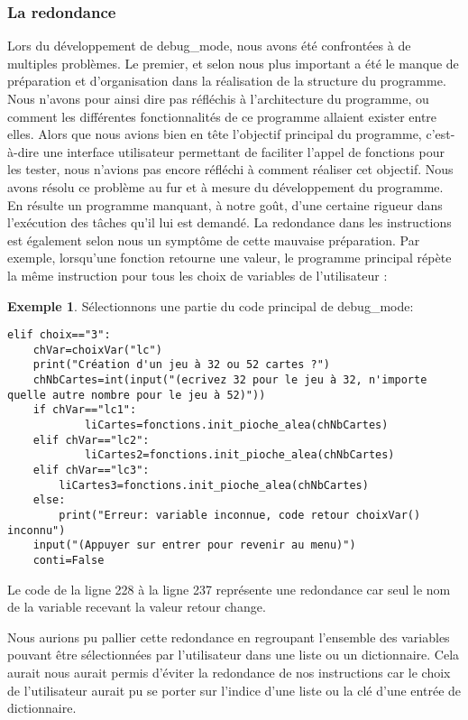 \documentclass[10pt,a4paper,french,titlepage]{article}
\theoremstyle{definition}
\newtheorem{exmp}{Exemple}
\begin{document}
\subsubsection{La redondance}
Lors du développement de debug\_mode, nous avons été confrontées à de multiples problèmes. Le premier, et selon nous plus important a été le manque de préparation et d'organisation dans la réalisation de la structure du programme. Nous n'avons pour ainsi dire pas réfléchis à l'architecture du programme, ou comment les différentes fonctionnalités de ce programme allaient exister entre elles. Alors que nous avions bien en tête l'objectif principal du programme, c’est-à-dire une interface utilisateur permettant de faciliter l'appel de fonctions pour les tester, nous n'avions pas encore réfléchi à comment réaliser cet objectif. Nous avons résolu ce problème au fur et à mesure du développement du programme. En résulte un programme manquant, à notre goût, d'une certaine rigueur dans l'exécution des tâches qu'il lui est demandé. La redondance dans les instructions est également selon nous un symptôme de cette mauvaise préparation. Par exemple, lorsqu’une fonction retourne une valeur, le programme principal répète la même instruction pour tous les choix de variables de l’utilisateur :
\begin{exmp}
Sélectionnons une partie du code principal de debug\_mode:
\begin{lstlisting}
elif choix=="3":
	chVar=choixVar("lc")
    print("Création d'un jeu à 32 ou 52 cartes ?")
    chNbCartes=int(input("(ecrivez 32 pour le jeu à 32, n'importe quelle autre nombre pour le jeu à 52)"))
    if chVar=="lc1":
    		liCartes=fonctions.init_pioche_alea(chNbCartes)
    elif chVar=="lc2":
    		liCartes2=fonctions.init_pioche_alea(chNbCartes)
	elif chVar=="lc3":
		liCartes3=fonctions.init_pioche_alea(chNbCartes)
    else:
		print("Erreur: variable inconnue, code retour choixVar() inconnu")
    input("(Appuyer sur entrer pour revenir au menu)")
	conti=False
\end{lstlisting}
Le code de la ligne 228 à la ligne 237 représente une redondance car seul le nom de la variable recevant la valeur retour change.
\end{exmp}
Nous aurions pu pallier cette redondance en regroupant l'ensemble des variables pouvant être sélectionnées par l'utilisateur dans une liste ou un dictionnaire. Cela aurait nous aurait permis d'éviter la redondance de nos instructions car le choix de l'utilisateur aurait pu se porter sur l'indice d'une liste ou la clé d'une entrée de dictionnaire.
\end{document}
